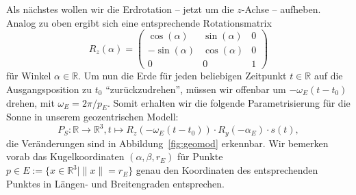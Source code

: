 \documentclass[
    paper=a4,
    DIV14,
    fontsize=12pt,
    pagesize=pdftex,
    toc=bibliographynumbered
]{scrartcl}
\numberwithin{figure}{section}
\numberwithin{equation}{section}
\numberwithin{table}{section}
\newcommand*\setR{\mathds{R}}
\begin{document}
Als nächstes wollen wir die Erdrotation -- jetzt um die $z$-Achse -- aufheben. Analog zu
oben ergibt sich eine entsprechende Rotationsmatrix
\begin{equation*}
    R_z(\alpha) =
    \begin{pmatrix}
         \cos(\alpha) & \sin(\alpha) & 0 \\
        -\sin(\alpha) & \cos(\alpha) & 0 \\
        0             & 0            & 1
    \end{pmatrix}
\end{equation*}
für Winkel $\alpha\in\setR$. Um nun die Erde für jeden beliebigen Zeitpunkt $t\in\setR$
auf die Ausgangsposition zu $t_0$ \enquote{zurückzudrehen}, müssen wir offenbar um
$-\omega_E(t-t_0)$ drehen, mit $\omega_E = 2\pi/p_E$. Somit erhalten wir die folgende
Parametrisierung für die Sonne in unserem geozentrischen Modell:
\begin{equation*}
    P_S : \setR \to \setR^3, t\mapsto R_z(-\omega_E(t-t_0)) \cdot R_y(-\alpha_E) \cdot
    s(t),
\end{equation*}
die Veränderungen sind in Abbildung~\ref{fig:geomod} erkennbar. Wir bemerken vorab das
Kugelkoordinaten $(\alpha, \beta, r_E)$ für Punkte $p \in E := \{ x\in\setR^3 \mid \|x\| =
r_E \}$ genau den Koordinaten des entsprechenden Punktes in Längen- und Breitengraden
entsprechen.
\end{document}
